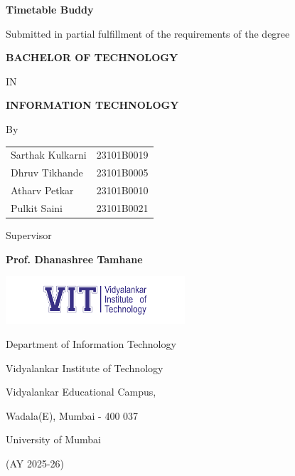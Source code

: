 \documentclass[12pt,a4paper]{report}
\begin{document}
\begin{titlepage}
    \centering
    \vspace*{1cm}
    
    {\LARGE\bfseries Timetable Buddy\par}
    \vspace{1cm}
    
    {\large Submitted in partial fulfillment of the requirements of the degree\par}
    \vspace{0.5cm}
    {\Large\bfseries BACHELOR OF TECHNOLOGY\par}
    \vspace{0.3cm}
    {\large IN\par}
    \vspace{0.3cm}
    {\Large\bfseries INFORMATION TECHNOLOGY\par}
    \vspace{1.5cm}
    
    {\large By\par}
    \vspace{0.5cm}
    \begin{tabular}{lr}
        Sarthak Kulkarni & 23101B0019 \\
        Dhruv Tikhande & 23101B0005 \\
        Atharv Petkar & 23101B0010 \\
        Pulkit Saini & 23101B0021 \\
    \end{tabular}
    \vspace{1.5cm}
    
    {\large Supervisor\par}
    \vspace{0.3cm}
    {\large\bfseries Prof. Dhanashree Tamhane\par}
    \vspace{1.5cm}
    
    \includegraphics[width=0.5\textwidth]{vit_logo.png}
    \vspace{1cm}
    
    {\large Department of Information Technology\par}
    {\large Vidyalankar Institute of Technology\par}
    {\large Vidyalankar Educational Campus,\par}
    {\large Wadala(E), Mumbai - 400 037\par}
    \vspace{0.5cm}
    {\large University of Mumbai\par}
    \vspace{0.5cm}
    {\large (AY 2025-26)\par}
    
\end{titlepage}
\end{document}
